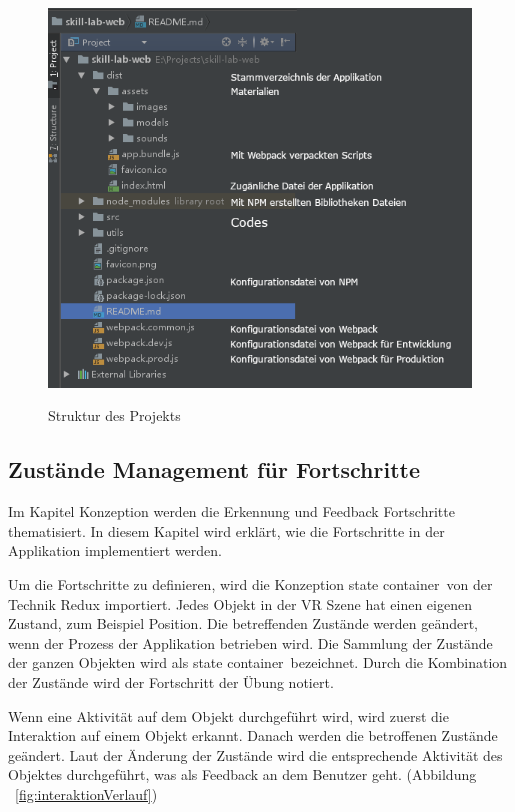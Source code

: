 \begin{figure}[ht]
\centering
\caption[Struktur des Projekts]{Struktur des Projekts}
\includegraphics[width=\textwidth]{images/projektSturktur.png}
\label{fig:projektStruktur} 
\end{figure}
 
 \subsection{Zustände Management für Fortschritte}
 Im Kapitel Konzeption werden die Erkennung und Feedback Fortschritte thematisiert. In diesem Kapitel wird erklärt, wie die Fortschritte in der Applikation implementiert werden.
 
 Um die Fortschritte zu definieren, wird die Konzeption \glqq state container\grqq\ von der Technik Redux importiert. Jedes Objekt in der VR Szene hat einen eigenen Zustand, zum Beispiel Position. Die betreffenden Zustände werden geändert, wenn der Prozess der Applikation betrieben wird. Die Sammlung der Zustände der ganzen Objekten wird als \glqq state container\grqq\ bezeichnet. Durch die Kombination der Zustände wird der Fortschritt der Übung notiert.
 
 Wenn eine Aktivität auf dem Objekt durchgeführt wird, wird zuerst die Interaktion auf einem Objekt erkannt. Danach werden die betroffenen Zustände geändert. Laut der Änderung der Zustände wird die entsprechende Aktivität des Objektes durchgeführt, was als Feedback an dem Benutzer geht. (Abbildung ~\ref{fig:interaktionVerlauf})
 
